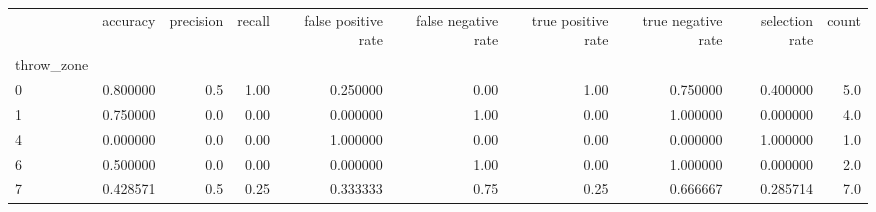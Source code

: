 \begin{tabular}{lrrrrrrrrr}
\toprule
{} &  accuracy &  precision &  recall &  false positive rate &  false negative rate &  true positive rate &  true negative rate &  selection rate &  count \\
throw\_zone &           &            &         &                      &                      &                     &                     &                 &        \\
\midrule
0          &  0.800000 &        0.5 &    1.00 &             0.250000 &                 0.00 &                1.00 &            0.750000 &        0.400000 &    5.0 \\
1          &  0.750000 &        0.0 &    0.00 &             0.000000 &                 1.00 &                0.00 &            1.000000 &        0.000000 &    4.0 \\
4          &  0.000000 &        0.0 &    0.00 &             1.000000 &                 0.00 &                0.00 &            0.000000 &        1.000000 &    1.0 \\
6          &  0.500000 &        0.0 &    0.00 &             0.000000 &                 1.00 &                0.00 &            1.000000 &        0.000000 &    2.0 \\
7          &  0.428571 &        0.5 &    0.25 &             0.333333 &                 0.75 &                0.25 &            0.666667 &        0.285714 &    7.0 \\
\bottomrule
\end{tabular}
